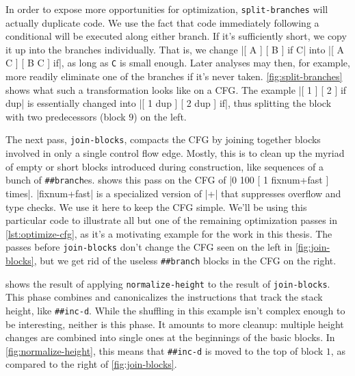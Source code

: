 
In order to expose more opportunities for optimization, \Verb|split-branches|
will actually duplicate code.  We use the fact that code immediately following
a conditional will be executed along either branch.  If it's sufficiently
short, we copy it up into the branches individually.  That is, we change
%
\factor|[ A ] [ B ] if C|
%
into
%
\factor|[ A C ] [ B C ] if|,
%
as long as \Verb|C| is small enough.  Later analyses may then, for example,
more readily eliminate one of the branches if it's never taken.
\vref{fig:split-branches} shows what such a transformation looks like on a
\gls{CFG}.  The example
%
\factor|[ 1 ] [ 2 ] if dup|
%
is essentially changed into
%
\factor|[ 1 dup ] [ 2 dup ] if|,
%
thus splitting the block with two predecessors (block $9$) on the left.


The next pass, \Verb|join-blocks|, compacts the \gls{CFG} by joining together
blocks involved in only a single control flow edge.  Mostly, this is to clean
up the myriad of empty or short blocks introduced during construction, like
sequences of a bunch of \Verb|##branch|es.   shows this
pass on the \gls{CFG} of
%
\factor|0 100 [ 1 fixnum+fast ] times|.
%
\factor|fixnum+fast| is a specialized version of \factor|+| that suppresses
overflow and type checks.  We use it here to keep the \gls{CFG} simple.  We'll
be using this particular code to illustrate all but one of the remaining
optimization passes in \vref{lst:optimize-cfg}, as it's a motivating example
for the work in this thesis.  The passes before \Verb|join-blocks| don't
change the \gls{CFG} seen on the left in \vref{fig:join-blocks}, but we get rid
of the useless \Verb|##branch| blocks in the \gls{CFG} on the right.


 shows the result of applying
\Verb|normalize-height| to the result of \Verb|join-blocks|.  This phase
combines and canonicalizes the instructions that track the stack height, like
\Verb|##inc-d|.  While the shuffling in this example isn't complex enough to
be interesting, neither is this phase.  It amounts to more cleanup: multiple
height changes are combined into single ones at the beginnings of the basic
blocks.  In \vref{fig:normalize-height}, this means that \Verb|##inc-d| is
moved to the top of block $1$, as compared to the right of
\vref{fig:join-blocks}.

